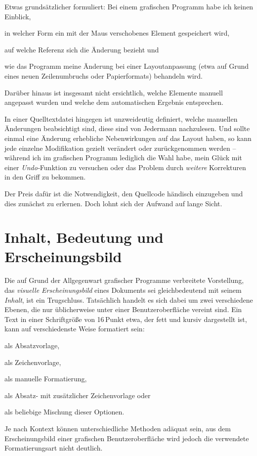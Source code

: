 \documentclass[DIV=12]{scrreprt}
\begin{document}
Etwas grundsätzlicher formuliert: Bei einem grafischen Programm habe ich keinen Einblick, 
\begin{inparaenum}[1)]
\item in welcher Form ein mit der Maus verschobenes Element gespeichert wird,
\item auf welche Referenz sich die Änderung bezieht und
\item wie das Programm meine Änderung bei einer Layoutanpassung (etwa auf Grund eines neuen Zeilenumbruchs oder Papierformats) behandeln wird.
\end{inparaenum}
Darüber hinaus ist insgesamt nicht ersichtlich, welche Elemente manuell angepasst wurden und welche dem automatischen Ergebnis entsprechen.

In einer Quelltextdatei hingegen ist unzweideutig definiert, welche manuellen Änderungen beabsichtigt sind, diese sind von Jedermann nachzulesen.
Und sollte einmal eine Änderung erhebliche Nebenwirkungen auf das Layout haben, so kann jede einzelne Modifikation gezielt verändert oder zurückgenommen werden -- während ich im grafischen Programm lediglich die Wahl habe, mein Glück mit einer \emph{Undo-}Funktion zu versuchen oder das Problem durch \emph{weitere} Korrekturen in den Griff zu bekommen.

Der Preis dafür ist die Notwendigkeit, den Quellcode händisch einzugeben und dies zunächst zu erlernen.
Doch lohnt sich der Aufwand auf lange Sicht.

\section{Inhalt, Bedeutung und Erscheinungsbild}
\label{sec:pt_separation-content-meaning-appearance}
Die auf Grund der Allgegenwart grafischer Programme verbreitete Vorstellung, das \emph{visuelle Erscheinungsbild} eines Dokuments sei gleichbedeutend mit seinem \emph{Inhalt}, ist ein Trugschluss.
Tatsächlich handelt es sich dabei um zwei verschiedene Ebenen, die nur üblicherweise unter einer Benutzeroberfläche vereint sind.
Ein Text in einer Schriftgröße von 16\,Punkt etwa, der fett und kursiv dargestellt ist, kann auf verschiedenste Weise formatiert sein:
\begin{inparaenum}[1)]
\item als Absatzvorlage,
\item als Zeichenvorlage,
\item als manuelle Formatierung,
\item als Absatz- mit zusätzlicher Zeichenvorlage oder
\item als beliebige Mischung dieser Optionen.
\end{inparaenum}
Je nach Kontext können unterschiedliche Methoden adäquat sein, aus dem Erscheinungsbild einer grafischen Benutzeroberfläche wird jedoch die verwendete Formatierungsart nicht deutlich.
\end{document}

